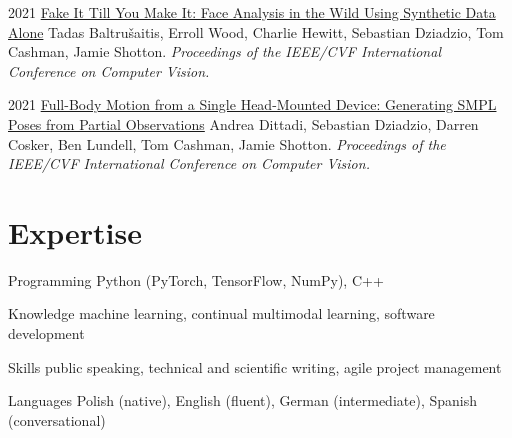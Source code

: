 \documentclass[]{friggeri-cv_osx}
\begin{document}
\begin{entrylist}
\entry
{2021}
{\href{https://scholar.google.com/citations?user=8vAIQXoAAAAJ&hl=en}{Fake It Till You Make It: Face Analysis in the Wild Using Synthetic Data Alone}}
{}
{Tadas Baltru\v{s}aitis, Erroll Wood, Charlie Hewitt, Sebastian Dziadzio, Tom Cashman, Jamie Shotton.
\textit{Proceedings of the IEEE/CVF International Conference on Computer Vision.}\\}

\entry
{2021}
{\href{https://scholar.google.com/citations?user=8vAIQXoAAAAJ&hl=en}{Full-Body Motion from a Single Head-Mounted Device: Generating SMPL Poses from Partial Observations}}
{}
{Andrea Dittadi, Sebastian Dziadzio, Darren Cosker, Ben Lundell, Tom Cashman, Jamie Shotton.
\textit{Proceedings of the IEEE/CVF International Conference on Computer Vision.}}
\end{entrylist}

\section{Expertise}
\begin{entrylist}
\entry
{}
{Programming}
{}
{Python (PyTorch, TensorFlow, NumPy), C++}

\entry
{}
{Knowledge}
{}
{machine learning, continual multimodal learning, software development}

\entry
{}
{Skills}
{}
{public speaking, technical and scientific writing, agile project management}

\entry
{}
{Languages}
{}
{Polish (native), English (fluent), German (intermediate), Spanish (conversational)}
\end{entrylist}
\end{document}
